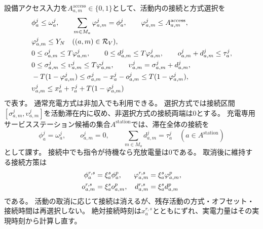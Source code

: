 設備アクセス入力を$A_{a,m}^{\mathrm{access}}\in\{0,1\}$として、活動内の接続と方式選択を
\begin{align}
 &\phi_a^j\le\omega_a^j,\qquad
 \sum_{m\in M_a}\varphi_{a,m}^j=\phi_a^j,\qquad
 \varphi_{a,m}^j\le A_{a,m}^{\mathrm{access}},\notag\\
 &\varphi_{a,m}^j\le Y_N\quad((a,m)\in\mathcal R_V),
 \label{eq:mf-connection-choice}\\
 &0\le o_{a,m}^j\le T\varphi_{a,m}^j,\qquad
 0\le d_{a,m}^j\le T\varphi_{a,m}^j,\qquad
 o_{a,m}^j+d_{a,m}^j\le\tau_a^j,
 \label{eq:mf-connection-duration}\\
 &0\le\sigma_{a,m}^j\le\upsilon_{a,m}^j\le T\varphi_{a,m}^j,
 \qquad\upsilon_{a,m}^j=\sigma_{a,m}^j+d_{a,m}^j,\notag\\
 &-T(1-\varphi_{a,m}^j)\le
 \sigma_{a,m}^j-x_a^j-o_{a,m}^j
 \le T(1-\varphi_{a,m}^j),\notag\\
 &\upsilon_{a,m}^j\le x_a^j+\tau_a^j+T(1-\varphi_{a,m}^j)
 \label{eq:mf-connection-interval}
\end{align}
で表す。
通常充電方式は非加入でも利用できる。
選択方式では接続区間$[\sigma_{a,m}^j,\upsilon_{a,m}^j]$を活動滞在内に収め、非選択方式の接続両端は0とする。
充電専用サービスステーション候補の集合$A^{\mathrm{station}}$では、滞在全体の接続を
\begin{equation}
 \phi_a^j=\omega_a^j,\qquad o_{a,m}^j=0,
 \qquad\sum_{m\in M_a}d_{a,m}^j=\tau_a^j
 \quad(a\in A^{\mathrm{station}})
 \label{eq:mf-station-connection}
\end{equation}
として課す。
接続中でも指令が待機なら充放電量は0である。
取消後に維持する接続方策は
\begin{align}
 \phi_a^{r,s}&=\xi_a^s\phi_a^p,&
 \varphi_{a,m}^{r,s}&=\xi_a^s\varphi_{a,m}^p,\notag\\
 o_{a,m}^{r,s}&=\xi_a^s o_{a,m}^p,&
 d_{a,m}^{r,s}&=\xi_a^s d_{a,m}^p
 \label{eq:mf-fixed-connection-policy}
\end{align}
である。
活動の取消に応じて接続は消えるが、残存活動の方式・オフセット・接続時間は再選択しない。
絶対接続時刻は$x_a^{r,s}$とともにずれ、実電力量はその実現時刻から計算し直す。

